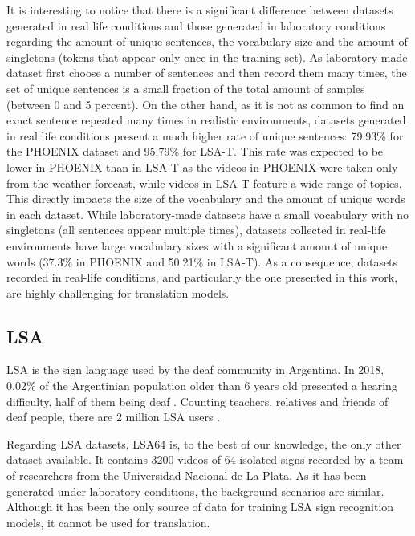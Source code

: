 It is interesting to notice that there is a significant difference between datasets generated in real life conditions and those generated in laboratory conditions regarding the amount of unique sentences, the vocabulary size and the amount of singletons (tokens that appear only once in the training set). As laboratory-made dataset first choose a number of sentences and then record them many times, the set of unique sentences is a small fraction of the total amount of samples (between 0 and 5 percent). On the other hand, as it is not as common to find an exact sentence repeated many times in realistic environments, datasets generated in real life conditions present a much higher rate of unique sentences: 79.93\% for the PHOENIX dataset and 95.79\% for LSA-T. This rate was expected to be lower in PHOENIX than in LSA-T as the videos in PHOENIX were taken only from the weather forecast, while videos in LSA-T feature a wide range of topics. This directly impacts the size of the vocabulary and the amount of unique words in each dataset. While laboratory-made datasets have a small vocabulary with no singletons (all sentences appear multiple times), datasets collected in real-life environments have large vocabulary sizes with a significant amount of unique words (37.3\% in PHOENIX and 50.21\% in LSA-T). As a consequence, datasets recorded in real-life conditions, and particularly the one presented in this work, are highly challenging for translation models.

\subsection{LSA}

LSA is the sign language used by the deaf community in Argentina. In 2018, 0.02\% of the Argentinian population older than 6 years old presented a hearing difficulty, half of them being deaf \cite{instituto2018estudio}. Counting teachers, relatives and friends of deaf people, there are 2 million LSA users \cite{url:lsa}.

Regarding LSA datasets, LSA64 \cite{ronchetti2016sign}\cite{ronchetti2016lsa64} is, to the best of our knowledge, the only other dataset available. It contains 3200 videos of 64 isolated signs recorded by a team of researchers from the Universidad Nacional de La Plata. As it has been generated under laboratory conditions, the background scenarios are similar. Although it has been the only source of data for training LSA sign recognition models, it cannot be used for translation.

